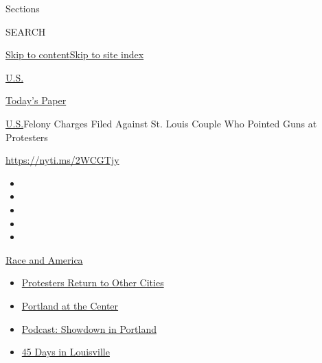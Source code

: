 Sections

SEARCH

\protect\hyperlink{site-content}{Skip to
content}\protect\hyperlink{site-index}{Skip to site index}

\href{https://www.nytimes3xbfgragh.onion/section/us}{U.S.}

\href{https://myaccount.nytimes3xbfgragh.onion/auth/login?response_type=cookie\&client_id=vi}{}

\href{https://www.nytimes3xbfgragh.onion/section/todayspaper}{Today's
Paper}

\href{/section/us}{U.S.}\textbar{}Felony Charges Filed Against St. Louis
Couple Who Pointed Guns at Protesters

\url{https://nyti.ms/2WCGTjy}

\begin{itemize}
\item
\item
\item
\item
\item
\end{itemize}

\href{https://www.nytimes3xbfgragh.onion/news-event/george-floyd-protests-minneapolis-new-york-los-angeles?action=click\&pgtype=Article\&state=default\&region=TOP_BANNER\&context=storylines_menu}{Race
and America}

\begin{itemize}
\tightlist
\item
  \href{https://www.nytimes3xbfgragh.onion/2020/07/26/us/protests-portland-seattle-trump.html?action=click\&pgtype=Article\&state=default\&region=TOP_BANNER\&context=storylines_menu}{Protesters
  Return to Other Cities}
\item
  \href{https://www.nytimes3xbfgragh.onion/2020/07/24/us/portland-oregon-protests-white-race.html?action=click\&pgtype=Article\&state=default\&region=TOP_BANNER\&context=storylines_menu}{Portland
  at the Center}
\item
  \href{https://www.nytimes3xbfgragh.onion/2020/07/23/podcasts/the-daily/portland-protests.html?action=click\&pgtype=Article\&state=default\&region=TOP_BANNER\&context=storylines_menu}{Podcast:
  Showdown in Portland}
\item
  \href{https://www.nytimes3xbfgragh.onion/interactive/2020/07/16/us/black-lives-matter-protests-louisville-breonna-taylor.html?action=click\&pgtype=Article\&state=default\&region=TOP_BANNER\&context=storylines_menu}{45
  Days in Louisville}
\end{itemize}

